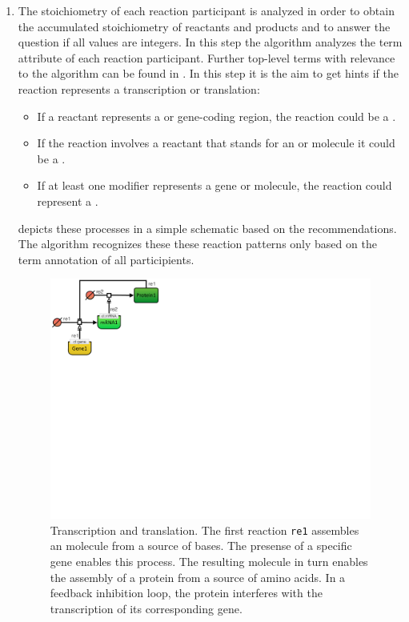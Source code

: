 \begin{enumerate}
  \item The stoichiometry of each reaction participant is analyzed in order to obtain the accumulated stoichiometry of reactants and products and to answer the question if all values are integers.
In this step the algorithm analyzes the \SBO term \citep{Courtot2011} attribute of each reaction participant.
Further top-level \SBO terms with relevance to the algorithm can be found in .
In this step it is the aim to get hints if the reaction represents a transcription or translation:
  \begin{itemize}
    \item If a reactant represents a \gene or gene-coding region, the reaction could be a \transcription.
    \item If the reaction involves a reactant that stands for an \RNA or \mRNA molecule it could be a \translation.
    \item If at least one modifier represents a gene or \RNA molecule, the reaction could represent a \translation.
  \end{itemize}
   depicts these processes in a simple schematic based on the \SBGN recommendations.
  The algorithm recognizes these these reaction patterns only based on the \SBO term annotation of all participients.
  \begin{figure}
    \includegraphics[width=.45\textwidth]{img/SBGN_gene-regulation}
    \caption[Transcription and translation]{Transcription and translation.
The first reaction \texttt{re1} assembles an \mRNA molecule from a source of bases.
The presense of a specific gene enables this process.
The resulting \mRNA molecule in turn enables the assembly of a protein from a source of amino acids.
In a feedback inhibition loop, the protein interferes with the transcription of its corresponding gene.}
    \label{fig:TranscriptionAndTranslation}
  \end{figure}


\end{enumerate}
